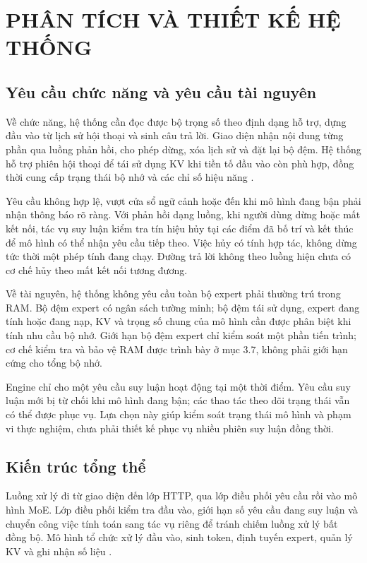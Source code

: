 \chapter{PHÂN TÍCH VÀ THIẾT KẾ HỆ THỐNG}


\section{Yêu cầu chức năng và yêu cầu tài nguyên}

Về chức năng, hệ thống cần đọc được bộ trọng số theo định dạng hỗ trợ, dựng đầu vào từ lịch sử hội thoại và sinh câu trả lời. Giao diện nhận nội dung từng phần qua luồng phản hồi, cho phép dừng, xóa lịch sử và đặt lại bộ đệm. Hệ thống hỗ trợ phiên hội thoại để tái sử dụng KV khi tiền tố đầu vào còn phù hợp, đồng thời cung cấp trạng thái bộ nhớ và các chỉ số hiệu năng \cite{moe_tierengine_arch}.

Yêu cầu không hợp lệ, vượt cửa sổ ngữ cảnh hoặc đến khi mô hình đang bận phải nhận thông báo rõ ràng. Với phản hồi dạng luồng, khi người dùng dừng hoặc mất kết nối, tác vụ suy luận kiểm tra tín hiệu hủy tại các điểm đã bố trí và kết thúc để mô hình có thể nhận yêu cầu tiếp theo. Việc hủy có tính hợp tác, không dừng tức thời một phép tính đang chạy. Đường trả lời không theo luồng hiện chưa có cơ chế hủy theo mất kết nối tương đương.

Về tài nguyên, hệ thống không yêu cầu toàn bộ expert phải thường trú trong RAM. Bộ đệm expert có ngân sách tường minh; bộ đệm tái sử dụng, expert đang tính hoặc đang nạp, KV và trọng số chung của mô hình cần được phân biệt khi tính nhu cầu bộ nhớ. Giới hạn bộ đệm expert chỉ kiểm soát một phần tiến trình; cơ chế kiểm tra và bảo vệ RAM được trình bày ở mục 3.7, không phải giới hạn cứng cho tổng bộ nhớ.

Engine chỉ cho một yêu cầu suy luận hoạt động tại một thời điểm. Yêu cầu suy luận mới bị từ chối khi mô hình đang bận; các thao tác theo dõi trạng thái vẫn có thể được phục vụ. Lựa chọn này giúp kiểm soát trạng thái mô hình và phạm vi thực nghiệm, chưa phải thiết kế phục vụ nhiều phiên suy luận đồng thời.

\section{Kiến trúc tổng thể}

Luồng xử lý đi từ giao diện đến lớp HTTP, qua lớp điều phối yêu cầu rồi vào mô hình MoE. Lớp điều phối kiểm tra đầu vào, giới hạn số yêu cầu đang suy luận và chuyển công việc tính toán sang tác vụ riêng để tránh chiếm luồng xử lý bất đồng bộ. Mô hình tổ chức xử lý đầu vào, sinh token, định tuyến expert, quản lý KV và ghi nhận số liệu \cite{moe_tierengine_arch}.

